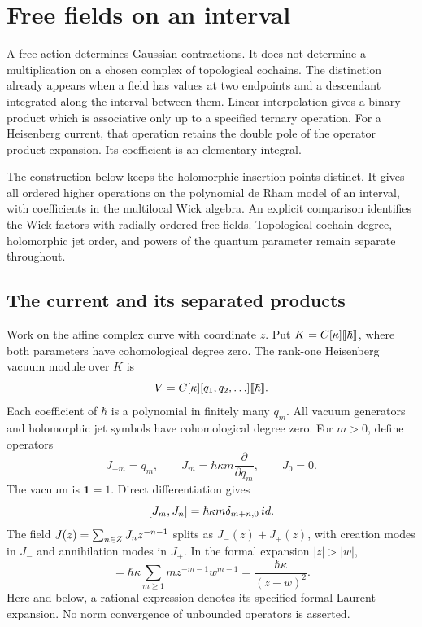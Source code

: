 \chapter{Free fields on an interval}
\label{chap:free-field-interval}

A free action determines Gaussian contractions.  It does not determine a
multiplication on a chosen complex of topological cochains.  The distinction
already appears when a field has values at two endpoints and a descendant
integrated along the interval between them.  Linear interpolation gives a
binary product which is associative only up to a specified ternary operation.
For a Heisenberg current, that operation retains the double pole of the
operator product expansion.  Its coefficient is an elementary integral.

The construction below keeps the holomorphic insertion points distinct.
It gives all ordered higher operations on the polynomial de Rham model of
an interval, with coefficients in the multilocal Wick algebra.  An explicit
comparison identifies the Wick factors with radially ordered free fields.
Topological cochain degree, holomorphic jet order, and powers of the quantum
parameter remain separate throughout.

\section{The current and its separated products}

Work on the affine complex curve with coordinate $z$.  Put
$K=C[\kappa]\llbracket\hbar\rrbracket$, where both parameters have
cohomological degree zero.  The rank-one Heisenberg vacuum module over $K$ is
\[
 V=C[\kappa][q_1,q_2,\ldots]\llbracket\hbar\rrbracket.
\]
Each coefficient of $\hbar$ is a polynomial in finitely many $q_m$.
All vacuum generators and holomorphic jet symbols have cohomological degree zero.
For $m>0$, define operators
\[
 J_{-m}=q_m,\qquad
 J_m=\hbar\kappa m\frac{\partial}{\partial q_m},\qquad J_0=0.
\]
The vacuum is $\mathbf1=1$.  Direct differentiation gives
\[
 [J_m,J_n]=\hbar\kappa m\delta_{m+n,0}\,id.
\]
The field $J(z)=\sum_{n\in Z}J_nz^{-n-1}$ splits as
$J_-(z)+J_+(z)$, with creation modes in $J_-$ and annihilation modes
in $J_+$.  In the formal expansion $|z|>|w|$,
\begin{equation*}
 [J_+(z),J_-(w)]
 =\hbar\kappa\sum_{m\ge1}m z^{-m-1}w^{m-1}
 =\frac{\hbar\kappa}{(z-w)^2}.
\end{equation*}
Here and below, a rational expression denotes its specified formal Laurent
expansion.  No norm convergence of unbounded operators is asserted.

